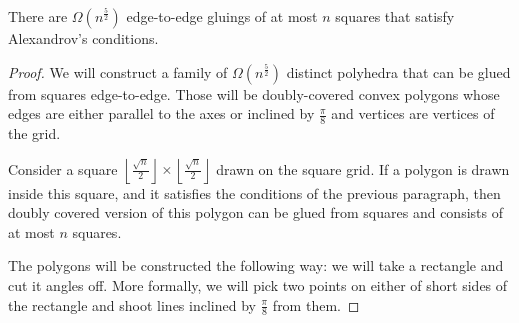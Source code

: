 \documentclass[a4paper,11pt]{article}
\begin{document}
\begin{theorem}
	There are $\Omega \left( n^{\frac52} \right)$ edge-to-edge gluings of at most $n$ squares that satisfy Alexandrov's conditions.
\end{theorem}

\begin{proof}
We will construct a family of $\Omega \left( n^{\frac52} \right)$ distinct polyhedra that can be glued from squares edge-to-edge. Those will be doubly-covered convex polygons whose edges are either parallel to the axes or inclined by $\frac{\pi}{8}$ and vertices are vertices of the grid.

Consider a square $\left \lfloor \frac{\sqrt n}{2} \right \rfloor \times \left \lfloor \frac{\sqrt n}{2} \right \rfloor$ drawn on the square grid. If a polygon is drawn inside this square, and it satisfies the conditions of the previous paragraph, then doubly covered version of this polygon can be glued from squares and consists of at most $n$ squares.

The polygons will be constructed the following way: we will take a rectangle and cut it angles off. More formally, we will pick two points on either of short sides of the rectangle and shoot lines inclined by $\frac{\pi}{8}$ from them.


\end{proof}

% 
\end{document}
